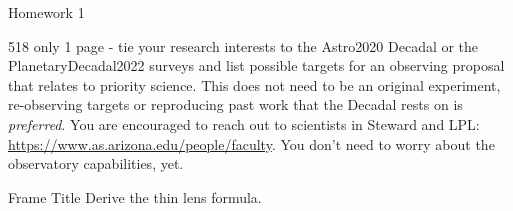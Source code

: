 Homework 1


\begin{frame}{518 only}
    1 page - tie your research interests to the Astro2020 Decadal or the PlanetaryDecadal2022 surveys and list possible targets for an observing proposal that relates to priority science. 
    This does not need to be an original experiment, re-observing targets or reproducing past work that the Decadal rests on is \textit{preferred}.
    You are encouraged to reach out to scientists in Steward and LPL: \url{https://www.as.arizona.edu/people/faculty}.
    You don't need to worry about the observatory capabilities, yet.
\end{frame}
\begin{frame}{Frame Title}
Derive the thin lens formula.

\end{frame}
